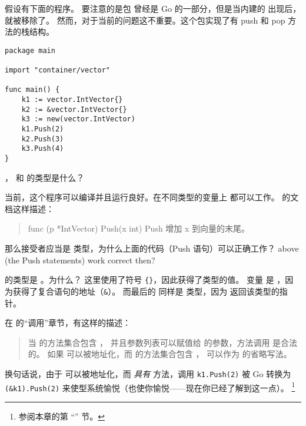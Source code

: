 \begin{Exercise}[title={方法调用},difficulty=2]
\label{ex:methodcalls}
\Question \label{ex:methodcalls q1} 假设有下面的程序。
要注意的是包  曾经是 Go 的一部分，但是当内建的
 出现后，就被移除了。
然而，对于当前的问题这不重要。这个包实现了有 push 和 pop 方法的栈结构。

\begin{lstlisting}
package main

import "container/vector"

func main() {
	k1 := vector.IntVector{}
	k2 := &vector.IntVector{}
	k3 := new(vector.IntVector)
	k1.Push(2)
	k2.Push(3)
	k3.Push(4)
}
\end{lstlisting}
， 和  的类型是什么？

\Question 当前，这个程序可以编译并且运行良好。在不同类型的变量上 
都可以工作。 的文档这样描述：
\begin{quote}
func (p *IntVector) Push(x int)
Push 增加 x 到向量的末尾。
\end{quote}
那么接受者应当是  类型，为什么上面的代码（Push 语句）可以正确工作？
above (the Push statements) work correct then?

\end{Exercise}

\begin{Answer}
\Question {} 的类型是 。为什么？
这里使用了符号 \verb|{}|，因此获得了类型的值。
变量  是 ，因为获得了复合语句的地址（\verb|&|）。
而最后的  同样是  类型，因为 
返回该类型的指针。

\Question 在 \cite{go_spec} 的``调用''章节，有这样的描述：
\begin{quote}
当  的方法集合包含 ，
并且参数列表可以赋值给  的参数，方法调用  是合法的。
如果  可以被地址化，而  的方法集合包含 ，
 可以作为  的省略写法。
\end{quote}
换句话说，由于  可以被地址化，而 
\emph{具有}  方法，调用 \lstinline{k1.Push(2)} 被 Go 转换为 
\lstinline{(&k1).Push(2)} 来使型系统愉悦（也使你愉悦——现在你已经了解到这一点）。
\footnote{参阅本章的第 ``'' 节。}

\end{Answer}
